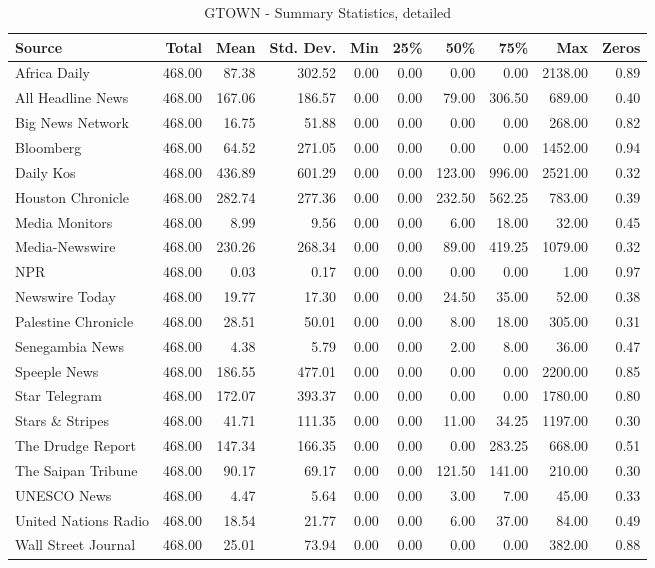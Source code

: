 \begin{table}[ht]
\centering
\caption{GTOWN - Summary Statistics, detailed} 
\label{tab:gtown_summary_detailed,}
\begin{tabular}{lrrrrrrrrr}
  \hline
Source & Total & Mean & Std. Dev. & Min & 25\% & 50\% & 75\% & Max & Zeros \\ 
  \hline
Africa Daily & 468.00 & 87.38 & 302.52 & 0.00 & 0.00 & 0.00 & 0.00 & 2138.00 & 0.89 \\ 
  All Headline News & 468.00 & 167.06 & 186.57 & 0.00 & 0.00 & 79.00 & 306.50 & 689.00 & 0.40 \\ 
  Big News Network & 468.00 & 16.75 & 51.88 & 0.00 & 0.00 & 0.00 & 0.00 & 268.00 & 0.82 \\ 
  Bloomberg & 468.00 & 64.52 & 271.05 & 0.00 & 0.00 & 0.00 & 0.00 & 1452.00 & 0.94 \\ 
  Daily Kos & 468.00 & 436.89 & 601.29 & 0.00 & 0.00 & 123.00 & 996.00 & 2521.00 & 0.32 \\ 
  Houston Chronicle & 468.00 & 282.74 & 277.36 & 0.00 & 0.00 & 232.50 & 562.25 & 783.00 & 0.39 \\ 
  Media Monitors & 468.00 & 8.99 & 9.56 & 0.00 & 0.00 & 6.00 & 18.00 & 32.00 & 0.45 \\ 
  Media-Newswire & 468.00 & 230.26 & 268.34 & 0.00 & 0.00 & 89.00 & 419.25 & 1079.00 & 0.32 \\ 
  NPR & 468.00 & 0.03 & 0.17 & 0.00 & 0.00 & 0.00 & 0.00 & 1.00 & 0.97 \\ 
  Newswire Today & 468.00 & 19.77 & 17.30 & 0.00 & 0.00 & 24.50 & 35.00 & 52.00 & 0.38 \\ 
  Palestine Chronicle & 468.00 & 28.51 & 50.01 & 0.00 & 0.00 & 8.00 & 18.00 & 305.00 & 0.31 \\ 
  Senegambia News & 468.00 & 4.38 & 5.79 & 0.00 & 0.00 & 2.00 & 8.00 & 36.00 & 0.47 \\ 
  Speeple News & 468.00 & 186.55 & 477.01 & 0.00 & 0.00 & 0.00 & 0.00 & 2200.00 & 0.85 \\ 
  Star Telegram & 468.00 & 172.07 & 393.37 & 0.00 & 0.00 & 0.00 & 0.00 & 1780.00 & 0.80 \\ 
  Stars \& Stripes & 468.00 & 41.71 & 111.35 & 0.00 & 0.00 & 11.00 & 34.25 & 1197.00 & 0.30 \\ 
  The Drudge Report & 468.00 & 147.34 & 166.35 & 0.00 & 0.00 & 0.00 & 283.25 & 668.00 & 0.51 \\ 
  The Saipan Tribune & 468.00 & 90.17 & 69.17 & 0.00 & 0.00 & 121.50 & 141.00 & 210.00 & 0.30 \\ 
  UNESCO News & 468.00 & 4.47 & 5.64 & 0.00 & 0.00 & 3.00 & 7.00 & 45.00 & 0.33 \\ 
  United Nations Radio & 468.00 & 18.54 & 21.77 & 0.00 & 0.00 & 6.00 & 37.00 & 84.00 & 0.49 \\ 
  Wall Street Journal & 468.00 & 25.01 & 73.94 & 0.00 & 0.00 & 0.00 & 0.00 & 382.00 & 0.88 \\ 
   \hline
\end{tabular}
\end{table}
